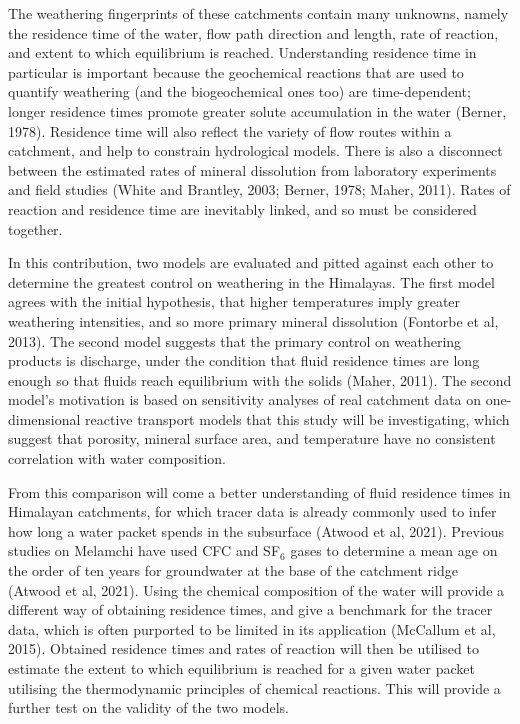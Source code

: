 The weathering fingerprints of these catchments contain many unknowns, namely the residence time of the water, flow path direction and length, rate of reaction, and extent to which equilibrium is reached. Understanding residence time in particular is important because the geochemical reactions that are used to quantify weathering (and the biogeochemical ones too) are time-dependent; longer residence times promote greater solute accumulation in the water (Berner, 1978). Residence time will also reflect the variety of flow routes within a catchment, and help to constrain hydrological models. There is also a disconnect between the estimated rates of mineral dissolution from laboratory experiments and field studies (White and Brantley, 2003; Berner, 1978; Maher, 2011). Rates of reaction and residence time are inevitably linked, and so must be considered together.

\bsk

In this contribution, two models are evaluated and pitted against each other to determine the greatest control on weathering in the Himalayas. The first model agrees with the initial hypothesis, that higher temperatures imply greater weathering intensities, and so more primary mineral dissolution (Fontorbe et al, 2013). The second model suggests that the primary control on weathering products is discharge, under the condition that fluid residence times are long enough so that fluids reach equilibrium with the solids (Maher, 2011). The second model's motivation is based on sensitivity analyses of real catchment data on one-dimensional reactive transport models that this study will be investigating, which suggest that porosity, mineral surface area, and temperature have no consistent correlation with water composition. 

\bsk

From this comparison will come a better understanding of fluid residence times in Himalayan catchments, for which tracer data is already commonly used to infer how long a water packet spends in the subsurface (Atwood et al, 2021). Previous studies on Melamchi have used CFC and SF$_6$ gases to determine a mean age on the order of ten years for groundwater at the base of the catchment ridge (Atwood et al, 2021). Using the chemical composition of the water will provide a different way of obtaining residence times, and give a benchmark for the tracer data, which is often purported to be limited in its application (McCallum et al, 2015). Obtained residence times and rates of reaction will then be utilised to estimate the extent to which equilibrium is reached for a given water packet utilising the thermodynamic principles of chemical reactions. This will provide a further test on the validity of the two models.


